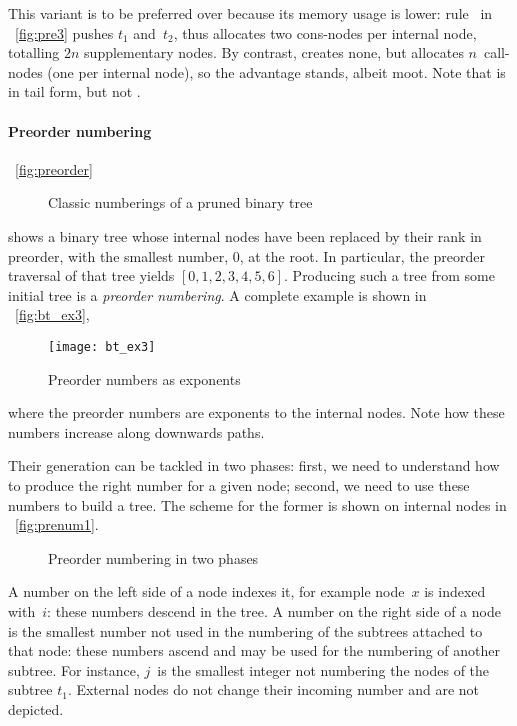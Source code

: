 This variant is to be preferred over
 because its
memory usage is lower: rule~\clause{\delta} in
\fig~\vref{fig:pre3} pushes \(t_1\) and~\(t_2\), thus allocates two
cons\hyp{}nodes per internal node, totalling \(2n\)
supplementary nodes. By contrast, 
creates none, but allocates \(n\)~call\hyp{}nodes
 (one per internal node), so the
advantage stands, albeit moot. Note that
 is in tail
form, but not .

\paragraph{Preorder numbering}

\Fig~\vref{fig:preorder}
\begin{figure}
\centering
{}
\;
\;
\;
\caption{Classic numberings of a pruned binary tree}
\label{fig:orders}
\end{figure}
shows a binary tree whose internal nodes have been replaced by their
rank in preorder, with the smallest number, \(0\), at the root. In
particular, the preorder traversal of that tree yields
\([0,1,2,3,4,5,6]\). Producing such a tree from some initial tree is a
\emph{preorder numbering}. A
complete example is shown in \fig~\vref{fig:bt_ex3},
\begin{figure}[b]
\centering
\texttt{[image: bt\_ex3]}
\caption{Preorder numbers as exponents}
\label{fig:bt_ex3}
\end{figure}
where the preorder numbers are exponents to the internal nodes. Note
how these numbers increase along downwards paths.

Their generation can be tackled in two phases: first, we need to
understand how to produce the right number for a given node; second,
we need to use these numbers to build a tree. The scheme for the
former is shown on internal nodes in \fig~\vref{fig:prenum1}.
\begin{figure}[t]
\centering
{}
\qquad
{}
\caption{Preorder numbering in two phases}
\label{fig:prenum}
\end{figure}
A number on the left side of a node indexes it, for example node~\(x\)
is indexed with~\(i\): these numbers descend in the tree. A number on
the right side of a node is the smallest number not used in the
numbering of the subtrees attached to that node: these numbers ascend
and may be used for the numbering of another subtree. For instance,
\(j\)~is the smallest integer not numbering the nodes of the subtree
\(t_1\). External nodes do not change their incoming number and are
not depicted.

